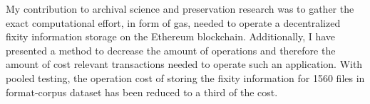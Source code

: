 My contribution to archival science and preservation research was to gather the exact computational effort, in form of gas, needed to operate a decentralized fixity information storage on the Ethereum blockchain. Additionally, I have presented a method to decrease the amount of operations and therefore the amount of cost relevant transactions needed to operate such an application. With pooled testing, the operation cost of storing the fixity information for 1560 files in format-corpus dataset has been reduced to a third of the cost.
